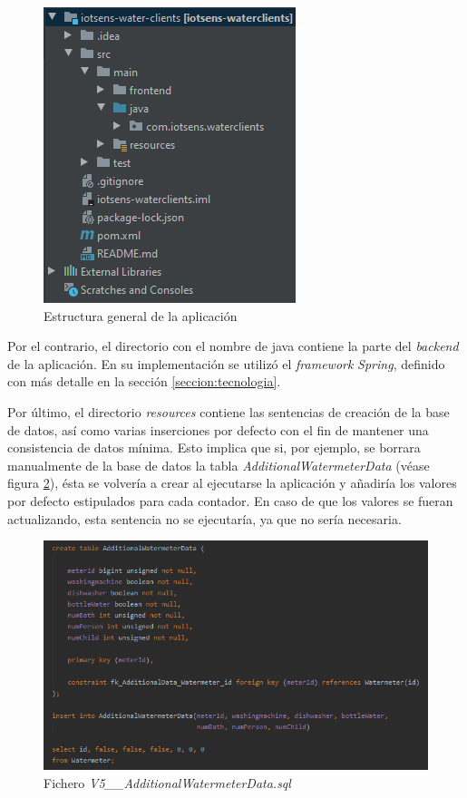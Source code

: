 \documentclass[pdftex,11pt,a4paper]{book}
\begin{document}
 \begin{figure}[h]
 \centering
 \includegraphics {images/implementacion/estructura-general.png}
 \caption{Estructura general de la aplicación} \label{fig:estructura-general}
 \end{figure}
 
 
Por el contrario, el directorio con el nombre de java contiene la parte del \textit{backend} de la aplicación. En su implementación se utilizó el \textit{framework} \textit{Spring}, definido con más detalle en la sección \ref{seccion:tecnologia}.

Por último, el directorio \textit{resources} contiene las sentencias de creación de la base de datos, así como varias inserciones por defecto con el fin de mantener una consistencia de datos mínima. Esto implica que si, por ejemplo, se borrara manualmente de la base de datos la tabla \textit{AdditionalWatermeterData} (véase figura \ref{fig:AdditionalWatermeterData.sql}), ésta se volvería a crear al ejecutarse la aplicación y añadiría los valores por defecto estipulados para cada contador. En caso de que los valores se fueran actualizando, esta sentencia no se ejecutaría, ya que no sería necesaria.

 \begin{figure}[h]
 \centering
 \includegraphics [scale=0.85] {images/implementacion/sentencia-sql.png}
 \caption{Fichero \textit{V5\_\_AdditionalWatermeterData.sql}} \label{fig:AdditionalWatermeterData.sql}
 \end{figure}
\end{document}
